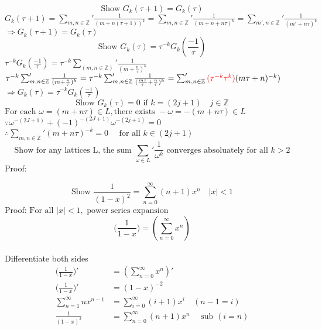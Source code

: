 \documentclass[10pt]{article}
\begin{document}
\noindent
\[\text{Show } G_{k}(\tau + 1) = G_{k}(\tau)\]
$G_{k}(\tau + 1) = \sum_{m, n \in \mathbb{Z}}' \frac{1}{(m+n(\tau+1))^k} = \sum_{m, n \in \mathbb{Z}}' \frac{1}{(m + n + n\tau)^k} = \sum_{m', n \in \mathbb{Z} }' \frac{1}{(m' + n\tau)^k}$\\
$\Rightarrow G_{k}(\tau + 1) = G_{k}(\tau)$\\

\noindent
\[\text{Show } G_{k}(\tau) = \tau^{-k} G_{k}(\frac{-1}{\tau})\]
$\tau^{-k} G_{k}(\frac{-1}{\tau}) =  \tau^{-k} \sum_{(m, n \in \mathbb{Z} )}' \frac{1}{(m+\frac{n}{\tau})^{k}}$\\
$\tau^{-k} \sum_{m, n \in \mathbb{Z}}' \frac{1}{(m + \frac{n}{\tau})^{k}} = \tau^{-k} \sum_{m, n \in \mathbb{Z}}' \frac{1}{(\frac{m\tau}{\tau} + \frac{n}{\tau})^{k}} = \sum_{m, n \in \mathbb{Z}}' \textcolor{red}{(\tau^{-k}\tau^{k})} (m\tau + n)^{-k})$\\
$\Rightarrow G_{k}(\tau) = \tau^{-k} G_{k}(\frac{-1}{\tau})$\\


\noindent
\[\text{Show }G_{k}(\tau) = 0 \text{ if } k = (2j+1) \quad j \in \mathbb{Z} \]
$\text{For each }\omega = (m+n\tau) \in L, \text{there exists } -\omega = -(m+n\tau) \in L $\\
$\because \omega ^{-(2J+1)} + (-1)^{-(2J+1)}\omega^{-(2j+1)} = 0$\\
$\therefore \sum_{m,n \in \mathbb{Z}}' (m+n\tau)^{-k} = 0\quad \text{ for all } k \in (2j+1)$\\

\noindent
\[\text{Show for any lattices L, the sum } \sum_{\omega \in \mathit{L}}' \frac{1}{\omega^{k}} \text{ converges absoluately for all } k > 2 \]
Proof:


\pagebreak
\noindent
\[\text{Show }\frac{1}{(1-x)^2} = \sum_{n=0}^{\infty} (n+1)x^n \quad |x| < 1\]
Proof:
$\text{For all } |x| < 1, \text{ power series expansion} $\\
\[(\frac{1}{1-x}\big) = (\sum_{n=0}^{\infty} x^n)\]\\
Differentiate both sides\\
\begin{equation}
\begin{aligned}
(\frac{1}{1-x}\big)' &= (\sum_{n=0}^{\infty} x^n)' \\
(\frac{1}{1-x}\big)' &= (1-x)^{-2}\\ 
\sum_{n=1}^{\infty} nx^{n-1} &= \sum_{i=0}^{\infty} (i+1)x^{i} \quad (n-1=i)\\
\frac{1}{(1-x)^2} &= \sum_{n=0}^{\infty} (n+1)x^{n} \quad \text{ sub }(i = n)\\
\end{aligned}
\end{equation}
\end{document}
